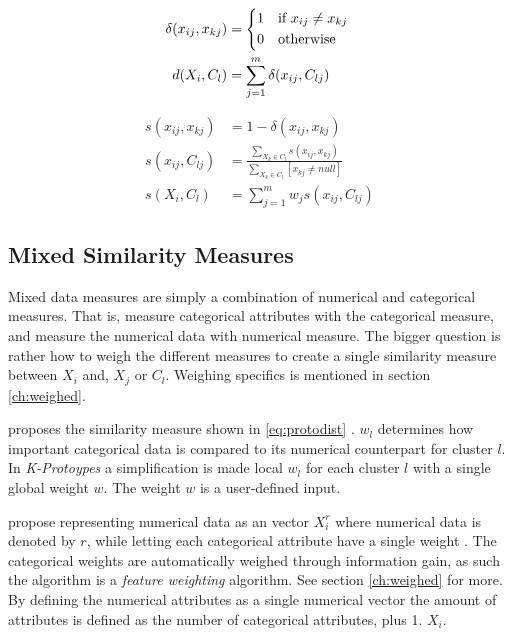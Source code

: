 \documentclass[../report.tex]{subfiles}
\begin{document}
\begin{align}
\label{eq:cat1}
\delta{(x_{ij},x_{kj})} &= 
  \begin{cases*}
  1 & if $x_{ij} \neq x_{kj}$ \\
    0 & otherwise
  \end{cases*} \\
\label{eq:catcent}
d(X_{i},C_l) &= \sum^{m}_{j=1}\delta(x_{ij},C_{lj})
\end{align}

\begin{align}
s(x_{ij},x_{kj}) &= 1 - \delta{(x_{ij},x_{kj})} \\
\label{eq:cat2}
s(x_{ij},C_{lj}) &= \frac{\sum_{X_k \in C_{l}}{s(x_{ij},x_{kj})}}{\sum_{X_k \in C_{l} }{[ x_{kj} \neq null ]}} \\
\label{eq:cat3}
s(X_{i},C_{l}) &= \sum_{j = 1}^{m}{w_j s(x_{ij},C_{lj})}
\end{align}

\subsection{Mixed Similarity Measures} \label{sssec:mixed-sim}
Mixed data measures are simply a combination of numerical and categorical measures. That is, measure categorical attributes with the categorical measure, and measure the numerical data with numerical measure. The bigger question is rather how to weigh the different measures to create a single similarity measure between $X_i$ and, $X_j$ or $C_l$. Weighing specifics is mentioned in section \ref{ch:weighed}.


\citeauthor{Huang97clusteringlarge} proposes the similarity measure shown in \ref{eq:protodist} \cite{Huang97clusteringlarge}. $w_l$ determines how important categorical data is compared to its numerical counterpart for cluster $l$. In \textit{K-Protoypes} a simplification is made local $w_l$ for each cluster $l$ with a single global weight $w$. The weight $w$ is a user-defined input.

\citeauthor{Cheung2013} \cite{Cheung2013} propose representing numerical data as an vector $X_{i}^{r}$ where numerical data is denoted by $r$, while letting each categorical attribute have a single weight . The categorical weights are automatically weighed through information gain, as such the algorithm is a \textit{feature weighting} algorithm. See section \ref{ch:weighed} for more. By defining the numerical attributes as a single numerical vector the amount of attributes is defined as the number of categorical attributes, plus 1. $X_{i}$.
\end{document}
